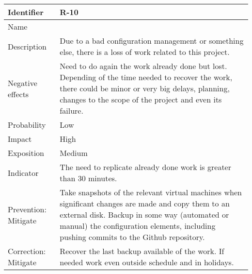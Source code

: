 \begin{table}[H]
	\begin{tabularx}{\textwidth}{|y|z|}
		\hline
		Identifier & \textbf{R-10} \\ \hline
		Name & \Rdiez \\ \hline
		Description &
			Due to a bad configuration management or something else, there is a loss of work related to this project.
		\\ \hline
		Negative effects &
			Need to do again the work already done but lost.\linej
			Depending of the time needed to recover the work, there could be minor or very big delays, planning, changes to the scope of the project and even its failure.
		\\ \hline
		Probability & Low\\ \hline
		Impact &  High\\ \hline
		Exposition &  Medium\\ \hline
		Indicator & The need to replicate already done work is greater than 30 minutes.\\ \hline
		Prevention: Mitigate &
			Take snapshots of the relevant virtual machines when significant changes are made and copy them to an external disk. \linej
			Backup in some way (automated or manual) the configuration elements, including pushing commits to the Github repository.
		\\ \hline
		Correction: Mitigate &
			Recover the last backup available of the work. \linej
			If needed work even outside schedule and in holidays.
		\\ \hline
	\end{tabularx}
\end{table}

